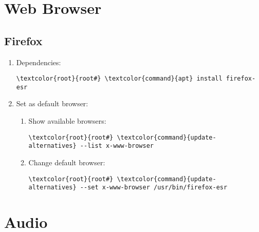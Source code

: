 \documentclass[10pt, a4paper, onecolumn, openany]{book} %
\begin{document}
\chapter{Web Browser}
\section{Firefox}
\begin{enumerate}
    \item Dependencies:
\begin{Verbatim}[commandchars=\\\{\}]
\textcolor{root}{root#} \textcolor{command}{apt} install firefox-esr
\end{Verbatim}
    \item Set as default browser:
    \begin{enumerate}
        \item Show available browsers:
        \begin{Verbatim}[commandchars=\\\{\}]
\textcolor{root}{root#} \textcolor{command}{update-alternatives} --list x-www-browser
\end{Verbatim}
        \item Change default browser:
\begin{Verbatim}[commandchars=\\\{\}]
\textcolor{root}{root#} \textcolor{command}{update-alternatives} --set x-www-browser /usr/bin/firefox-esr
\end{Verbatim}
    \end{enumerate}
\end{enumerate}
\chapter{Audio}
\end{document}
